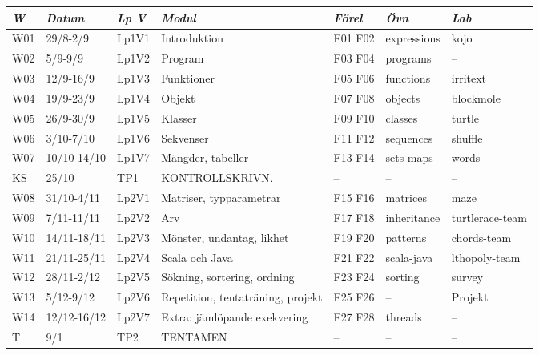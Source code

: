 \begin{tabular}{l|l|l|l|l|l|l}
\textit{W} & \textit{Datum} & \textit{Lp V} & \textit{Modul} & \textit{Förel} & \textit{Övn} & \textit{Lab} \\ \hline \hline
W01 & 29/8-2/9 & Lp1V1 & Introduktion & F01 F02 & expressions & kojo \\
W02 & 5/9-9/9 & Lp1V2 & Program & F03 F04 & programs & -- \\
W03 & 12/9-16/9 & Lp1V3 & Funktioner & F05 F06 & functions & irritext \\
W04 & 19/9-23/9 & Lp1V4 & Objekt & F07 F08 & objects & blockmole \\
W05 & 26/9-30/9 & Lp1V5 & Klasser & F09 F10 & classes & turtle \\
W06 & 3/10-7/10 & Lp1V6 & Sekvenser & F11 F12 & sequences & shuffle \\
W07 & 10/10-14/10 & Lp1V7 & Mängder, tabeller & F13 F14 & sets-maps & words \\
KS & 25/10 & TP1 & KONTROLLSKRIVN. & -- & -- & -- \\
W08 & 31/10-4/11 & Lp2V1 & Matriser, typparametrar & F15 F16 & matrices & maze \\
W09 & 7/11-11/11 & Lp2V2 & Arv & F17 F18 & inheritance & turtlerace-team \\
W10 & 14/11-18/11 & Lp2V3 & Mönster, undantag, likhet & F19 F20 & patterns & chords-team \\
W11 & 21/11-25/11 & Lp2V4 & Scala och Java & F21 F22 & scala-java & lthopoly-team \\
W12 & 28/11-2/12 & Lp2V5 & Sökning, sortering, ordning & F23 F24 & sorting & survey \\
W13 & 5/12-9/12 & Lp2V6 & Repetition, tentaträning, projekt & F25 F26 & -- & Projekt \\
W14 & 12/12-16/12 & Lp2V7 & Extra: jämlöpande exekvering & F27 F28 & threads & -- \\
T & 9/1 & TP2 & TENTAMEN & -- & -- & -- \\
\end{tabular}
